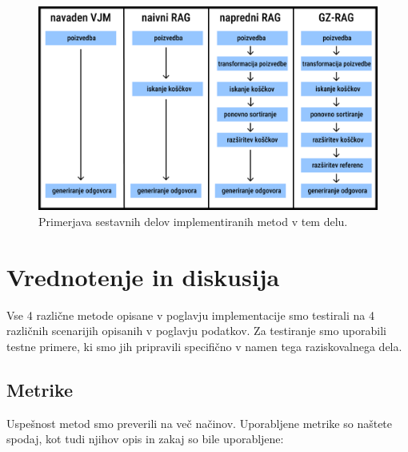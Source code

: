 \documentclass[a4paper,12pt,openright]{book}
\begin{document}
\begin{figure}[htbp]
    \centering
    \includegraphics[width=\textwidth]{rag_comparison.png}
    \caption{Primerjava sestavnih delov implementiranih metod v tem delu.}
    \label{rag_comparison}
\end{figure}

\chapter{Vrednotenje in diskusija}
\label{ch4}

Vse 4 različne metode opisane v poglavju implementacije smo testirali na 4 različnih scenarijih opisanih v poglavju podatkov. Za testiranje smo uporabili testne primere, ki smo jih pripravili specifično v namen tega raziskovalnega dela.

\section{Metrike}

Uspešnost metod smo preverili na več načinov. Uporabljene metrike so naštete spodaj, kot tudi njihov opis in zakaj so bile uporabljene:
\end{document}
